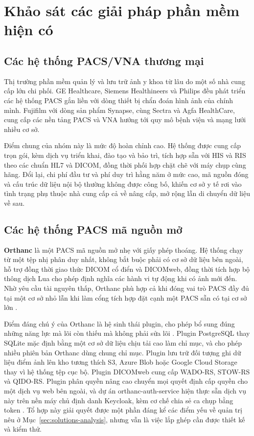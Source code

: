 \section{Khảo sát các giải pháp phần mềm hiện có}
\label{sec:solutions}

\subsection{Các hệ thống PACS/VNA thương mại}

Thị trường phần mềm quản lý và lưu trữ ảnh y khoa từ lâu do một số nhà cung cấp
lớn chi phối. GE Healthcare, Siemens Healthineers và Philips đều phát triển các
hệ thống PACS gắn liền với dòng thiết bị chẩn đoán hình ảnh của chính mình.
Fujifilm với dòng sản phẩm Synapse, cùng Sectra và Agfa HealthCare, cung cấp các
nền tảng PACS và VNA hướng tới quy mô bệnh viện và mạng lưới nhiều cơ sở.

Điểm chung của nhóm này là mức độ hoàn chỉnh cao. Hệ thống được cung cấp trọn
gói, kèm dịch vụ triển khai, đào tạo và bảo trì, tích hợp sẵn với HIS và RIS
theo các chuẩn HL7 và DICOM, đồng thời phối hợp chặt chẽ với máy chụp cùng hãng.
Đổi lại, chi phí đầu tư và phí duy trì hằng năm ở mức cao, mã nguồn đóng và cấu
trúc dữ liệu nội bộ thường không được công bố, khiến cơ sở y tế rơi vào tình
trạng phụ thuộc nhà cung cấp cả về nâng cấp, mở rộng lẫn di chuyển dữ liệu về
sau.

\subsection{Các hệ thống PACS mã nguồn mở}

\textbf{Orthanc} là một PACS mã nguồn mở nhẹ với giấy phép thoáng. Hệ thống chạy
từ một tệp nhị phân duy nhất, không bắt buộc phải có cơ sở dữ liệu bên ngoài, hỗ
trợ đồng thời giao thức DICOM cổ điển và DICOMweb, đồng thời tích hợp bộ thông
dịch Lua cho phép định nghĩa các hành vi tự động khi có ảnh mới đến. Nhờ yêu cầu
tài nguyên thấp, Orthanc phù hợp cả khi đóng vai trò PACS đầy đủ tại một cơ sở
nhỏ lẫn khi làm cổng tích hợp đặt cạnh một PACS sẵn có tại cơ sở lớn
\cite{jodogne2018orthanc}.

Điểm đáng chú ý của Orthanc là hệ sinh thái plugin, cho phép bổ sung đúng những
năng lực mà lõi còn thiếu mà không phải sửa lõi \cite{orthancbook}. Plugin
PostgreSQL thay SQLite mặc định bằng một cơ sở dữ liệu chịu tải cao làm chỉ mục, và
cho phép nhiều phiên bản Orthanc dùng chung chỉ mục. Plugin lưu trữ đối tượng ghi
dữ liệu điểm ảnh lên kho tương thích S3, Azure Blob hoặc Google Cloud Storage thay
vì hệ thống tệp cục bộ. Plugin DICOMweb cung cấp WADO-RS, STOW-RS và QIDO-RS. Plugin
phân quyền nâng cao chuyển mọi quyết định cấp quyền cho một dịch vụ web bên ngoài,
và dự án orthanc-auth-service hiện thực sẵn dịch vụ này trên nền máy chủ định danh
Keycloak, kèm cơ chế chia sẻ ca chụp bằng token \cite{orthancauth,keycloak}. Tổ hợp
này giải quyết được một phần đáng kể các điểm yếu về quản trị nêu ở
Mục~\ref{sec:solutions-analysis}, nhưng vẫn là việc lắp ghép cần được thiết kế và
kiểm thử.

